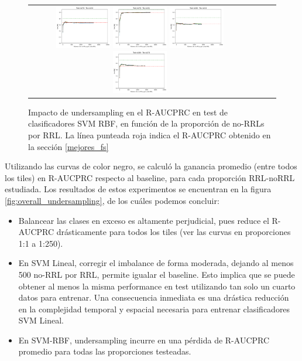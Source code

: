 \begin{figure}[h!]
\begin{tabular}{cccc}
\includegraphics[width=0.25\textwidth]{Kap7/train=b278_test=b234_rbf_individual_curves.png}  \includegraphics[width=0.25\textwidth]{Kap7/train=b278_test=b261_rbf_individual_curves.png} 
 \includegraphics[width=0.25\textwidth]{Kap7/train=b360_test=b234_rbf_individual_curves.png}  \includegraphics[width=0.25\textwidth]{Kap7/train=b360_test=b278_rbf_individual_curves.png} 
\end{tabular}
\caption{Impacto de undersampling en el R-AUCPRC en test de clasificadores SVM RBF, en función de la proporción de no-RRLs por RRL. La línea punteada roja indica el R-AUCPRC obtenido en la sección \protect\ref{mejores_fs}}
\label{fig:svmk_undersample}
\end{figure}

Utilizando las curvas de color negro, se calculó la ganancia promedio (entre todos los tiles) en R-AUCPRC respecto al baseline, para cada proporción RRL-noRRL estudiada. Los resultados de estos experimentos se encuentran en la figura \ref{fig:overall_undersampling}, de los cuáles podemos concluir:
\begin{itemize}
\item Balancear las clases en exceso es altamente perjudicial, pues reduce el R-AUCPRC drásticamente para todos los tiles (ver las curvas en proporciones 1:1 a 1:250).
\item En SVM Lineal, corregir el imbalance de forma moderada, dejando al menos 500 no-RRL por RRL, permite igualar el baseline. Esto implica que se puede obtener al menos la misma performance en test utilizando tan solo un cuarto datos para entrenar. Una consecuencia inmediata es una drástica reducción en la complejidad temporal y espacial necesaria para entrenar clasificadores SVM Lineal.
\item En SVM-RBF, undersampling incurre en una pérdida de R-AUCPRC promedio para todas las proporciones testeadas.
\end{itemize}

